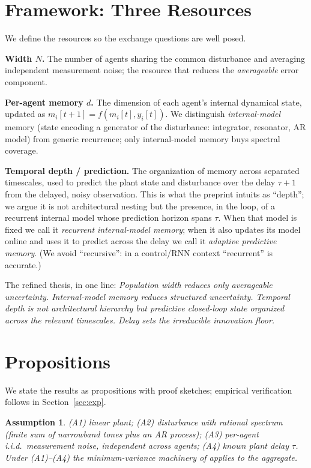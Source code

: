 \documentclass[journal]{IEEEtran}
\newtheorem{assumption}{Assumption}
\begin{document}
\section{Framework: Three Resources}
We define the resources so the exchange questions are well posed.

\textbf{Width $N$.} The number of agents sharing the common disturbance and
averaging independent measurement noise; the resource that reduces the
\emph{averageable} error component.

\textbf{Per-agent memory $d$.} The dimension of each agent's internal dynamical
state, updated as $m_i[t+1] = f(m_i[t], y_i[t])$. We distinguish
\emph{internal-model} memory (state encoding a generator of the disturbance:
integrator, resonator, AR model) from generic recurrence; only internal-model
memory buys spectral coverage.

\textbf{Temporal depth / prediction.} The organization of memory across
separated timescales, used to predict the plant state and disturbance over the
delay $\tau+1$ from the delayed, noisy observation. This is what the preprint
intuits as ``depth''; we argue it is not architectural nesting but the presence,
in the loop, of a recurrent internal model whose prediction horizon spans $\tau$.
When that model is fixed we call it \emph{recurrent internal-model memory}; when
it also updates its model online and uses it to predict across the delay we call
it \emph{adaptive predictive memory}. (We avoid ``recursive'': in a control/RNN
context ``recurrent'' is accurate.)

The refined thesis, in one line: \emph{Population width reduces only averageable
uncertainty. Internal-model memory reduces structured uncertainty. Temporal
depth is not architectural hierarchy but predictive closed-loop state organized
across the relevant timescales. Delay sets the irreducible innovation floor.}

\section{Propositions}
We state the results as propositions with proof sketches; empirical verification
follows in Section~\ref{sec:exp}.

\begin{assumption}\label{as:all}
(A1) linear plant; (A2) disturbance with rational spectrum (finite sum of
narrowband tones plus an AR process); (A3) per-agent i.i.d.\ measurement noise,
independent across agents; (A4) known plant delay $\tau$. Under
(A1)--(A4) the minimum-variance machinery of \cite{astrom1970} applies to the
aggregate.
\end{assumption}
\end{document}

